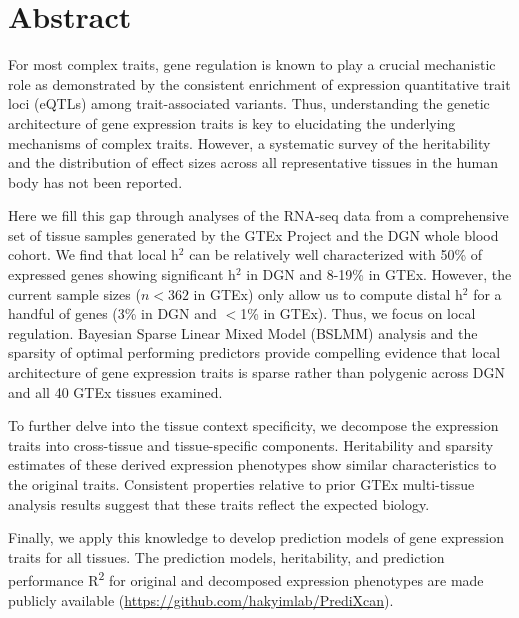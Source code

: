 \documentclass[10pt,letterpaper]{article}
\begin{document}
\section*{Abstract}
For most complex traits, gene regulation is known to play a crucial mechanistic role as demonstrated by the consistent enrichment of expression quantitative trait loci (eQTLs) among trait-associated variants. Thus, understanding the genetic architecture of gene expression traits is key to elucidating the underlying mechanisms of complex traits. However, a systematic survey of the heritability and the distribution of effect sizes across all representative tissues in the human body has not been reported.

Here we fill this gap through analyses of the RNA-seq data from a comprehensive set of tissue samples generated by the GTEx Project and the DGN whole blood cohort. We find that local h$^2$ can be relatively well characterized with 50\% of expressed genes showing significant h$^2$ in DGN and 8-19\% in GTEx. However, the current sample sizes ($n<362$ in GTEx) only allow us to compute distal h$^2$ for a handful of genes (3\% in DGN and $<$1\% in GTEx). Thus, we focus on local regulation. Bayesian Sparse Linear Mixed Model (BSLMM) analysis and the sparsity of optimal performing predictors provide compelling evidence that local architecture of gene expression traits is sparse rather than polygenic across DGN and all 40 GTEx tissues examined.

To further delve into the tissue context specificity, we decompose the expression traits into cross-tissue and tissue-specific components. Heritability and sparsity estimates of these derived expression phenotypes show similar characteristics to the original traits. Consistent properties relative to prior GTEx multi-tissue analysis results suggest that these traits reflect the expected biology.

Finally, we apply this knowledge to develop prediction models of gene expression traits for all tissues. The prediction models, heritability, and prediction performance R\textsuperscript{2} for original and decomposed expression phenotypes are made publicly available (\url{https://github.com/hakyimlab/PrediXcan}).


\end{document}
